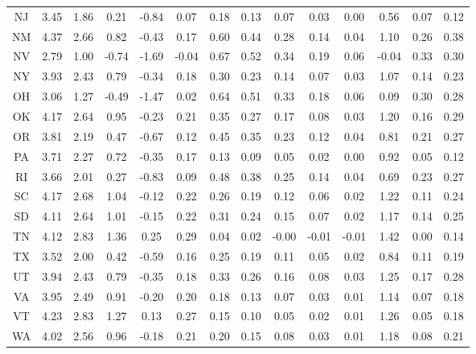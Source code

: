 \begin{table}
\begin{tabular}{cccccccccccccc}
   NJ &  3.45 &  1.86 &  0.21 & -0.84 &  0.07 &  0.18 &  0.13 &  0.07 &  0.03 &  0.00 &    0.56 &     0.07 &      0.12 \\
   NM &  4.37 &  2.66 &  0.82 & -0.43 &  0.17 &  0.60 &  0.44 &  0.28 &  0.14 &  0.04 &    1.10 &     0.26 &      0.38 \\
   NV &  2.79 &  1.00 & -0.74 & -1.69 & -0.04 &  0.67 &  0.52 &  0.34 &  0.19 &  0.06 &   -0.04 &     0.33 &      0.30 \\
   NY &  3.93 &  2.43 &  0.79 & -0.34 &  0.18 &  0.30 &  0.23 &  0.14 &  0.07 &  0.03 &    1.07 &     0.14 &      0.23 \\
   OH &  3.06 &  1.27 & -0.49 & -1.47 &  0.02 &  0.64 &  0.51 &  0.33 &  0.18 &  0.06 &    0.09 &     0.30 &      0.28 \\
   OK &  4.17 &  2.64 &  0.95 & -0.23 &  0.21 &  0.35 &  0.27 &  0.17 &  0.08 &  0.03 &    1.20 &     0.16 &      0.29 \\
   OR &  3.81 &  2.19 &  0.47 & -0.67 &  0.12 &  0.45 &  0.35 &  0.23 &  0.12 &  0.04 &    0.81 &     0.21 &      0.27 \\
   PA &  3.71 &  2.27 &  0.72 & -0.35 &  0.17 &  0.13 &  0.09 &  0.05 &  0.02 &  0.00 &    0.92 &     0.05 &      0.12 \\
   RI &  3.66 &  2.01 &  0.27 & -0.83 &  0.09 &  0.48 &  0.38 &  0.25 &  0.14 &  0.04 &    0.69 &     0.23 &      0.27 \\
   SC &  4.17 &  2.68 &  1.04 & -0.12 &  0.22 &  0.26 &  0.19 &  0.12 &  0.06 &  0.02 &    1.22 &     0.11 &      0.24 \\
   SD &  4.11 &  2.64 &  1.01 & -0.15 &  0.22 &  0.31 &  0.24 &  0.15 &  0.07 &  0.02 &    1.17 &     0.14 &      0.25 \\
   TN &  4.12 &  2.83 &  1.36 &  0.25 &  0.29 &  0.04 &  0.02 & -0.00 & -0.01 & -0.01 &    1.42 &     0.00 &      0.14 \\
   TX &  3.52 &  2.00 &  0.42 & -0.59 &  0.16 &  0.25 &  0.19 &  0.11 &  0.05 &  0.02 &    0.84 &     0.11 &      0.19 \\
   UT &  3.94 &  2.43 &  0.79 & -0.35 &  0.18 &  0.33 &  0.26 &  0.16 &  0.08 &  0.03 &    1.25 &     0.17 &      0.28 \\
   VA &  3.95 &  2.49 &  0.91 & -0.20 &  0.20 &  0.18 &  0.13 &  0.07 &  0.03 &  0.01 &    1.14 &     0.07 &      0.18 \\
   VT &  4.23 &  2.83 &  1.27 &  0.13 &  0.27 &  0.15 &  0.10 &  0.05 &  0.02 &  0.01 &    1.26 &     0.05 &      0.18 \\
   WA &  4.02 &  2.56 &  0.96 & -0.18 &  0.21 &  0.20 &  0.15 &  0.08 &  0.03 &  0.01 &    1.18 &     0.08 &      0.21 \\

\end{tabular}
\end{table}
